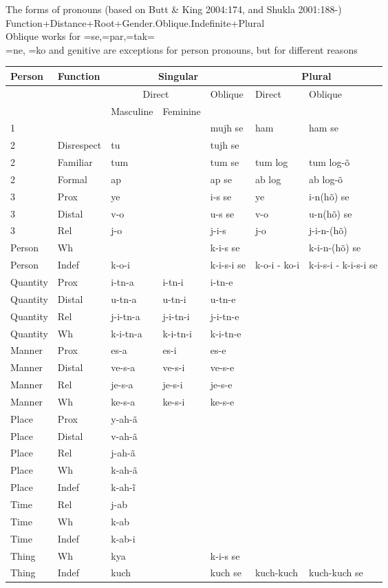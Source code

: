 \documentclass{article}
\let\ipa\textipa %
\begin{document}
\begin{example}The forms of pronouns (based on Butt \& King 2004:174, and Shukla 2001:188-) \\
Function+Distance+Root+Gender.Oblique.Indefinite+Plural\\
Oblique works for =se,=par,=tak=\ipa{m\~{E}}\\
=ne, =ko and genitive are exceptions for person pronouns, but for different reasons\\
\begin{tabular}{|ll|ll|l|l|l|}\hline
Person & Function & \multicolumn{3}{c|}{Singular} & \multicolumn{2}{c|}{Plural}  \\\hline
&& \multicolumn{2}{c|}{Direct} & Oblique & Direct & Oblique  \\\hline
&& Masculine & Feminine & & & \\\hline\hline
1 && \ipa{m\~{E}} && mujh se & ham & ham se\\
2 & Disrespect & tu && tujh se \\
2 & Familiar& tum && tum se & tum log & tum log-\~{o}\\
2 & Formal & ap && ap se & ab log & ab log-\~{o}\\\hline
3 & Prox & ye && i-s se & ye & i-n(h\~{o}) se\\
3 & Distal & v-o && u-s se & v-o & u-n(h\~{o}) se\\
3 & Rel & j-o && j-i-s & j-o & j-i-n-(h\~{o})\\
Person & Wh  & \ipa{k-On} && k-i-s se & \ipa{k-On} & k-i-n-(h\~{o}) se\\
Person & Indef & k-o-i && k-i-s-i se & k-o-i - ko-i & k-i-s-i - k-i-s-i se\\\hline
Quantity & Prox & i-tn-a & i-tn-i & i-tn-e\\
Quantity & Distal & u-tn-a & u-tn-i & u-tn-e\\
Quantity & Rel & j-i-tn-a & j-i-tn-i & j-i-tn-e \\
Quantity & Wh & k-i-tn-a & k-i-tn-i & k-i-tn-e\\\hline
Manner & Prox & es-a & es-i & es-e\\
Manner & Distal & ve-s-a & ve-s-i & ve-s-e\\
Manner & Rel & je-s-a & je-s-i & je-s-e\\
Manner & Wh & ke-s-a & ke-s-i & ke-s-e\\\hline
Place & Prox & y-ah-\~{a} \\
Place & Distal & v-ah-\~{a}\\
Place & Rel & j-ah-\~{a}\\
Place & Wh & k-ah-\~{a}\\
Place & Indef & k-ah-\~{i}\\\hline
Time & Rel & j-ab\\
Time & Wh & k-ab\\
Time & Indef & k-ab-i\\\hline\hline
Thing & Wh& kya && k-i-s se  \\
Thing & Indef & kuch && kuch se & kuch-kuch & kuch-kuch se\\\hline

\end{tabular}
\end{example}
\end{document}
